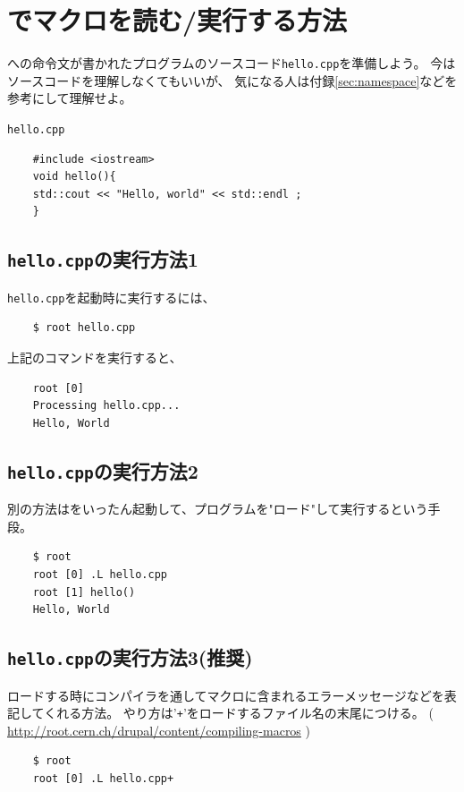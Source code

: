 \documentclass{jarticle}
\begin{document}
 \section{\ROOT でマクロを読む/実行する方法}
 \ROOT への命令文が書かれたプログラムのソースコード\verb|hello.cpp|を準備しよう。
 今はソースコードを理解しなくてもいいが、
 気になる人は付録\ref{sec:namespace}などを参考にして理解せよ。
 \begin{itembox}{\texttt{hello.cpp}}
\begin{verbatim}
	#include <iostream>
	void hello(){
	std::cout << "Hello, world" << std::endl ;
	}
\end{verbatim}
 \end{itembox}

  \subsection{\texttt{hello.cpp}の実行方法1}
  \verb|hello.cpp|を\ROOT 起動時に実行するには、
\begin{verbatim}
	$ root hello.cpp
\end{verbatim}
上記のコマンドを実行すると、
\begin{verbatim}
	root [0] 
	Processing hello.cpp...
	Hello, World
\end{verbatim}

  \subsection{\texttt{hello.cpp}の実行方法2}
  別の方法は\ROOT をいったん起動して、プログラムを"ロード"して実行するという手段。
\begin{verbatim}
	$ root
	root [0] .L hello.cpp 
	root [1] hello()
	Hello, World
\end{verbatim}

  \subsection{\texttt{hello.cpp}の実行方法3(推奨)}
  ロードする時に\Cpp コンパイラを通してマクロに含まれるエラーメッセージなどを表記してくれる方法。
  やり方は'\verb|+|'をロードするファイル名の末尾につける。
  ( \url{http://root.cern.ch/drupal/content/compiling-macros} )
\begin{verbatim}
	$ root
	root [0] .L hello.cpp+
\end{verbatim}
\end{document}
